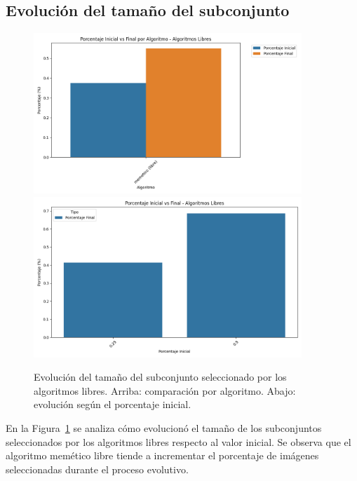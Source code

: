 \subsection{Evolución del tamaño del subconjunto}
\begin{figure}[H]
    \centering
    \includegraphics[width=0.9\textwidth]{imagenes/evaluaciones/painting/porcentaje-inical-vs-final-por-algoritmo}
    \vspace{1em}
    \includegraphics[width=0.9\textwidth]{imagenes/evaluaciones/painting/porcentaje-inicial-vs-final-por-pi}
    \caption{Evolución del tamaño del subconjunto seleccionado por los algoritmos libres.
        Arriba: comparación por algoritmo.
        Abajo: evolución según el porcentaje inicial.}
    \label{fig:evolucion_porcentaje_libre}
\end{figure}

En la Figura~\ref{fig:evolucion_porcentaje_libre} se analiza cómo evolucionó el tamaño de los subconjuntos seleccionados por los algoritmos libres respecto al valor inicial.
Se observa que el algoritmo memético libre tiende a incrementar el porcentaje de imágenes seleccionadas durante el proceso evolutivo.

